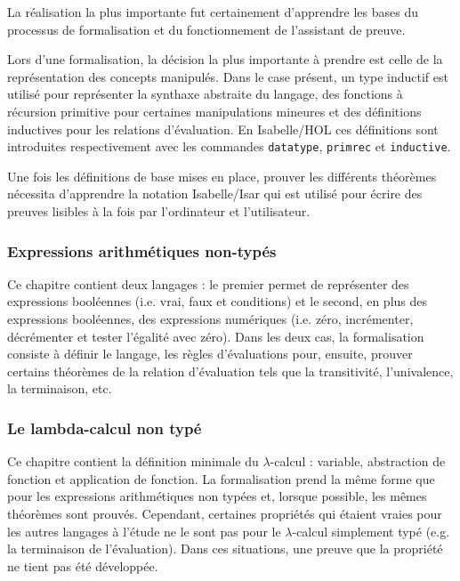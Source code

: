 \documentclass[a4paper, oneside, 12pt, titlepage]{article}
\begin{document}
La réalisation la plus importante fut certainement d'apprendre les bases du processus de
formalisation et du fonctionnement de l'assistant de preuve.

Lors d'une formalisation, la décision la plus importante à prendre est celle de la représentation
des concepts manipulés. Dans le case présent, un type inductif est utilisé pour représenter la
synthaxe abstraite du langage, des fonctions à récursion primitive pour certaines manipulations
mineures et des définitions inductives pour les relations d'évaluation. En Isabelle/HOL ces
définitions sont introduites respectivement avec les commandes \texttt{datatype}, \texttt{primrec}
et \texttt{inductive}.

Une fois les définitions de base mises en place, prouver les différents théorèmes nécessita
d'apprendre la notation Isabelle/Isar qui est utilisé pour écrire des preuves lisibles à la fois par
l'ordinateur et l'utilisateur.

\subsubsection{Expressions arithmétiques non-typés}

Ce chapitre contient deux langages : le premier permet de représenter des expressions booléennes
(i.e. vrai, faux et conditions) et le second, en plus des expressions booléennes, des expressions
numériques (i.e. zéro, incrémenter, décrémenter et tester l'égalité avec zéro). Dans les deux cas,
la formalisation consiste à définir le langage, les règles d'évaluations pour, ensuite, prouver certains
théorèmes de la relation d'évaluation tels que la transitivité, l'univalence, la terminaison, etc.

\subsubsection{Le lambda-calcul non typé}

Ce chapitre contient la définition minimale du $\lambda$-calcul : variable, abstraction de fonction
et application de fonction. La formalisation prend la même forme que pour les expressions
arithmétiques non typées et, lorsque possible, les mêmes théorèmes sont prouvés. Cependant, certaines
propriétés qui étaient vraies pour les autres langages à l'étude ne le sont pas pour le
$\lambda$-calcul simplement typé (e.g. la terminaison de l'évaluation). Dans ces situations, une
preuve que la propriété ne tient pas été développée.
\end{document}
